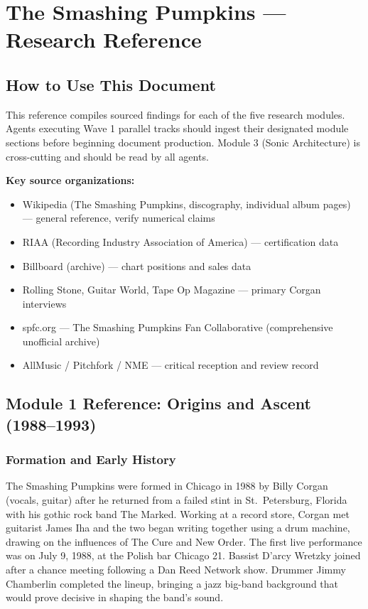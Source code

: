 \documentclass[11pt,letterpaper]{article}
\newcommand{\stageheader}[2]{%
  \noindent\colorbox{#2}{\makebox[\textwidth][l]{%
    \textcolor{white}{\bfseries\sffamily\hspace{6pt}#1\hspace{6pt}}}}%
  \vspace{0.5em}\par%
}
\begin{document}

\stageheader{STAGE 2 --- RESEARCH REFERENCE}{secondary}

\section{The Smashing Pumpkins --- Research Reference}

\subsection{How to Use This Document}

This reference compiles sourced findings for each of the five research modules. Agents executing Wave 1 parallel tracks should ingest their designated module sections before beginning document production. Module 3 (Sonic Architecture) is cross-cutting and should be read by all agents.

\textbf{Key source organizations:}
\begin{itemize}
  \item Wikipedia (The Smashing Pumpkins, discography, individual album pages) --- general reference, verify numerical claims
  \item RIAA (Recording Industry Association of America) --- certification data
  \item Billboard (archive) --- chart positions and sales data
  \item Rolling Stone, Guitar World, Tape Op Magazine --- primary Corgan interviews
  \item spfc.org --- The Smashing Pumpkins Fan Collaborative (comprehensive unofficial archive)
  \item AllMusic / Pitchfork / NME --- critical reception and review record
\end{itemize}

\subsection{Module 1 Reference: Origins and Ascent (1988--1993)}

\subsubsection{Formation and Early History}

The Smashing Pumpkins were formed in Chicago in 1988 by Billy Corgan (vocals, guitar) after he returned from a failed stint in St.\ Petersburg, Florida with his gothic rock band The Marked. Working at a record store, Corgan met guitarist James Iha and the two began writing together using a drum machine, drawing on the influences of The Cure and New Order. The first live performance was on July 9, 1988, at the Polish bar Chicago 21. Bassist D'arcy Wretzky joined after a chance meeting following a Dan Reed Network show. Drummer Jimmy Chamberlin completed the lineup, bringing a jazz big-band background that would prove decisive in shaping the band's sound.
\end{document}
